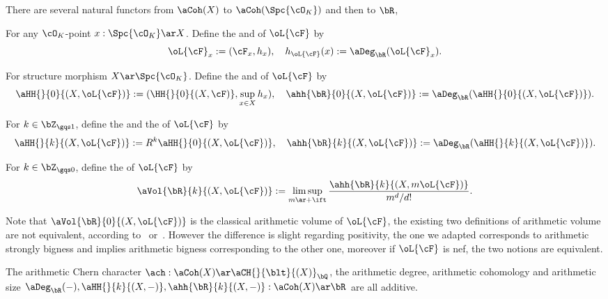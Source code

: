 \documentclass[article, a4paper, twoside]{universal}
\begin{document}
\begin{dfn}
	There are several natural functors from $\aCoh(X)$ to $\aCoh(\Spc{\cO_{K}})$ and then to $\bR$,
	\begin{itm}
		\item For any $\cO_{K}$-point $x:\Spc{\cO_{K}}\ar X$. Define the  and  of $\oL{\cF}$ by
		\[
			\oL{\cF}_{x}:=(\cF_{x},h_{x}),\quad h_{\oL{\cF}}(x):=\aDeg_{\bR}(\oL{\cF}_{x}).
		\]
		\item For structure morphism $X\ar\Spc{\cO_{K}}$. Define the  and  of $\oL{\cF}$ by
		\[
			\aHH{}{0}{(X,\oL{\cF})}:=(\HH{}{0}{(X,\cF)},\sup_{x\in X}h_{x}),\quad\ahh{\bR}{0}{(X,\oL{\cF})}:=\aDeg_{\bR}(\aHH{}{0}{(X,\oL{\cF})}).
		\]
		\item For $k\in\bZ_{\gqs1}$, define the  and the  of $\oL{\cF}$ by
		\[
			\aHH{}{k}{(X,\oL{\cF})}:=R^{k}\aHH{}{0}{(X,\oL{\cF})},\quad \ahh{\bR}{k}{(X,\oL{\cF})}:=\aDeg_{\bR}(\aHH{}{k}{(X,\oL{\cF})}).
		\]
		\item For $k\in\bZ_{\gqs0}$, define the  of $\oL{\cF}$ by
		\[
			\aVol{\bR}{k}{(X,\oL{\cF})}:=\limsup_{m\ar+\ift}\frac{\ahh{\bR}{k}{(X,m\oL{\cF})}}{m^{d}/d!}.
		\]
	\end{itm}

\end{dfn}

\begin{rmk}
	Note that $\aVol{\bR}{0}{(X,\oL{\cF})}$ is the classical arithmetic volume of $\oL{\cF}$, the existing two definitions of arithmetic volume are not equivalent, according to~\cite[Page~368]{Chen2011} or~\cite[Page~613]{Yuan2008Big}. However the difference is slight regarding positivity, the one we adapted corresponds to arithmetic strongly bigness and implies arithmetic bigness corresponding to the other one, moreover if $\oL{\cF}$ is nef, the two notions are equivalent.
\end{rmk}

\begin{thm}
	The arithmetic Chern character $\ach:\aCoh(X)\ar\aCH{}{\blt}{(X)}_{\bQ}$, the arithmetic degree, arithmetic cohomology and arithmetic size $\aDeg_{\bR}(-),\aHH{}{k}{(X,-)},\ahh{\bR}{k}{(X,-)}:\aCoh(X)\ar\bR$ are all additive.
\end{thm}
\end{document}
